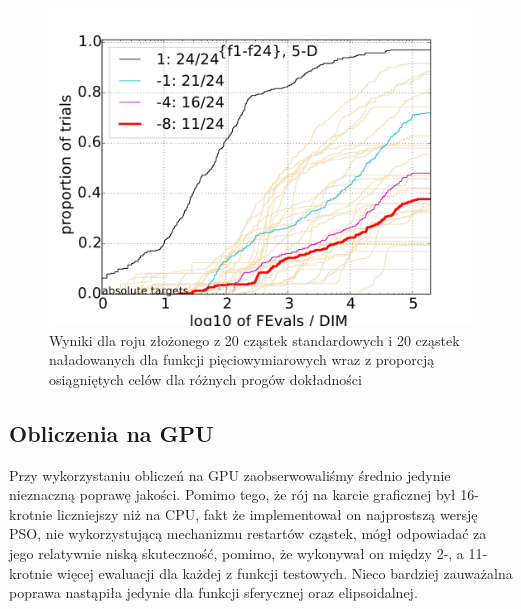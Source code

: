 \documentclass[12pt, twoside, openany, abstract=on]{report}
\theoremstyle{definition}
\begin{document}
\begin{figure}[H]
    \centering
    \includegraphics[scale=.75]{charts/1node20ch20st_5D.pdf} 
 \caption{Wyniki dla roju złożonego z 20 cząstek standardowych i 20 cząstek naładowanych dla funkcji pięciowymiarowych wraz z proporcją osiągniętych celów dla różnych progów dokładności}
\end{figure}

\subsection{Obliczenia na GPU}
Przy wykorzystaniu obliczeń na GPU zaobserwowaliśmy średnio jedynie nieznaczną poprawę jakości. Pomimo tego, że rój na karcie graficznej był 16-krotnie liczniejszy niż na CPU, fakt że implementował on najprostszą wersję PSO, nie wykorzystującą mechanizmu restartów cząstek, mógł odpowiadać za jego relatywnie niską skuteczność, pomimo, że wykonywał on między 2-, a 11-krotnie więcej ewaluacji dla każdej z funkcji testowych. Nieco bardziej zauważalna poprawa nastąpiła jedynie dla funkcji sferycznej oraz elipsoidalnej. 
\end{document}
